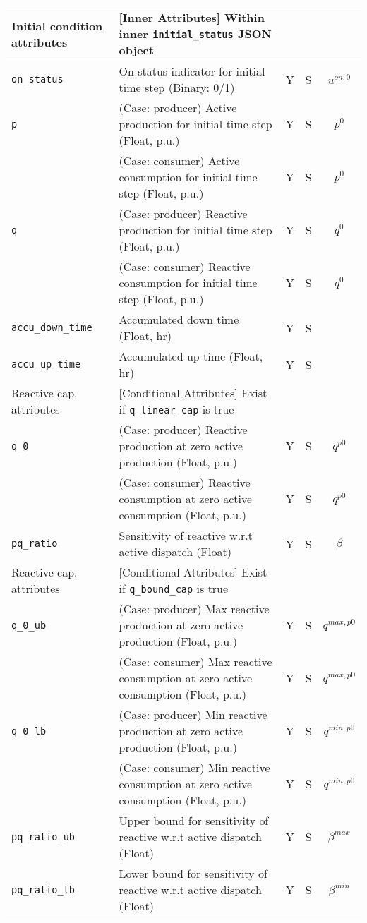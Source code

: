 \documentclass{article}
\begin{document}
\begin{center}
\small
\begin{tabular}{ l | l | c | c | c |}
  Initial condition attributes &  [Inner Attributes] Within inner {\tt initial\_status} JSON object &  &  & \\
  \hline
  {\tt on\_status} & On status indicator for initial time step (Binary: 0/1) & Y & S & $u^{on,0}$\\
  {\tt p} & { (Case: producer) Active production for initial time step (Float, p.u.) }& Y & S & $p^0$ \\
          & { (Case: consumer) Active consumption for initial time step (Float, p.u.) }& Y & S & $p^0$ \\
  {\tt q} & { (Case: producer) Reactive production for initial time step (Float, p.u.) }& Y & S & $q^0$ \\
          & { (Case: consumer) Reactive consumption for initial time step (Float, p.u.) }& Y & S & $q^0$ \\
  {\tt accu\_down\_time} & Accumulated down time (Float, hr) & Y & S & \\
  {\tt accu\_up\_time} & Accumulated up time (Float, hr) & Y & S & \\
 \hline
 \hline
  Reactive cap. attributes & [Conditional Attributes] Exist if {\tt q\_linear\_cap} is true &  &  & \\
  \hline
  {\tt q\_0}               & { (Case: producer) Reactive production at zero active production (Float, p.u.) }& Y & S & $q^{p0}$\\
                           & { (Case: consumer) Reactive consumption at zero active consumption (Float, p.u.) }& Y & S & $q^{p0}$\\
  {\tt pq\_ratio}          & Sensitivity of reactive w.r.t active dispatch (Float) & Y & S & $\beta$\\
  \hline
  Reactive cap. attributes & [Conditional Attributes] Exist if {\tt q\_bound\_cap} is true &  &  & \\
  \hline
  {\tt q\_0\_ub}           & { (Case: producer) Max reactive production at zero active production (Float, p.u.)} & Y & S & $q^{max,p0}$\\
                           & { (Case: consumer) Max reactive consumption at zero active consumption (Float, p.u.)} & Y & S & $q^{max,p0}$\\
  {\tt q\_0\_lb}           & { (Case: producer) Min reactive production at zero active production (Float, p.u.)} & Y & S & $q^{min,p0}$\\
                           & { (Case: consumer) Min reactive consumption at zero active consumption (Float, p.u.)} & Y & S & $q^{min,p0}$\\

  {\tt pq\_ratio\_ub}      & Upper bound for sensitivity of reactive w.r.t active dispatch (Float) & Y & S & $\beta^{max}$\\
  {\tt pq\_ratio\_lb}      & Lower bound for sensitivity of reactive w.r.t active dispatch (Float) & Y & S & $\beta^{min}$\\
  \hline
\end{tabular}
\end{center}
\end{document}

